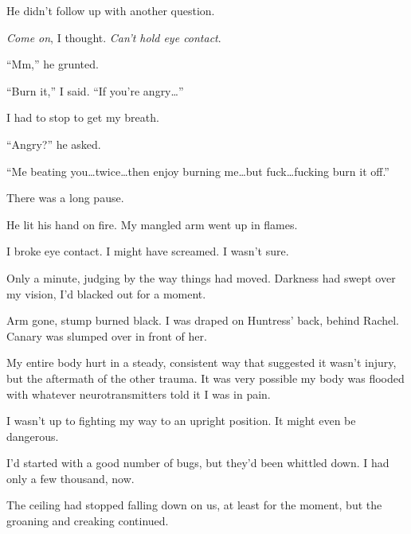 He didn't follow up with another question.



\emph{Come on}, I thought.  \emph{Can't hold eye contact}.



``Mm,'' he grunted.



``Burn it,'' I said.  ``If you're angry\ldots''



I had to stop to get my breath.



``Angry?'' he asked.



``Me beating you\ldots twice\ldots then enjoy burning me\ldots but fuck\ldots fucking burn it off.''



There was a long pause.



He lit his hand on fire.  My mangled arm went up in flames.



I broke eye contact.  I might have screamed.  I wasn't sure.



\blacksquare



Only a minute, judging by the way things had moved.  Darkness had swept over my vision, I'd blacked out for a moment.



Arm gone, stump burned black.  I was draped on Huntress' back, behind Rachel.  Canary was slumped over in front of her.



My entire body hurt in a steady, consistent way that suggested it wasn't injury, but the aftermath of the other trauma.  It was very possible my body was flooded with whatever neurotransmitters told it I was in pain.



I wasn't up to fighting my way to an upright position.  It might even be dangerous.



I'd started with a good number of bugs, but they'd been whittled down.  I had only a few thousand, now.



The ceiling had stopped falling down on us, at least for the moment, but the groaning and creaking continued.




